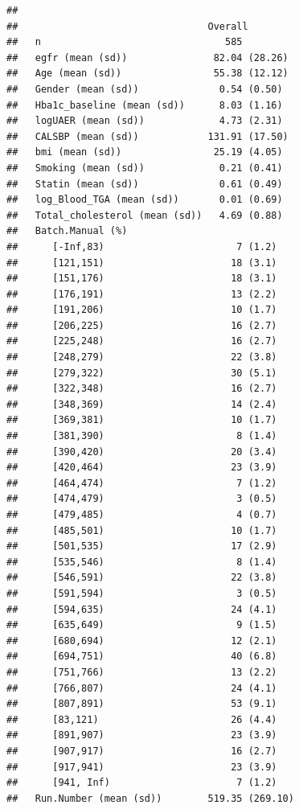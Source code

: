 \documentclass[]{article}
\begin{document}
\begin{verbatim}
##                                
##                                 Overall        
##   n                                585         
##   egfr (mean (sd))               82.04 (28.26) 
##   Age (mean (sd))                55.38 (12.12) 
##   Gender (mean (sd))              0.54 (0.50)  
##   Hba1c_baseline (mean (sd))      8.03 (1.16)  
##   logUAER (mean (sd))             4.73 (2.31)  
##   CALSBP (mean (sd))            131.91 (17.50) 
##   bmi (mean (sd))                25.19 (4.05)  
##   Smoking (mean (sd))             0.21 (0.41)  
##   Statin (mean (sd))              0.61 (0.49)  
##   log_Blood_TGA (mean (sd))       0.01 (0.69)  
##   Total_cholesterol (mean (sd))   4.69 (0.88)  
##   Batch.Manual (%)                             
##      [-Inf,83)                       7 (1.2)   
##      [121,151)                      18 (3.1)   
##      [151,176)                      18 (3.1)   
##      [176,191)                      13 (2.2)   
##      [191,206)                      10 (1.7)   
##      [206,225)                      16 (2.7)   
##      [225,248)                      16 (2.7)   
##      [248,279)                      22 (3.8)   
##      [279,322)                      30 (5.1)   
##      [322,348)                      16 (2.7)   
##      [348,369)                      14 (2.4)   
##      [369,381)                      10 (1.7)   
##      [381,390)                       8 (1.4)   
##      [390,420)                      20 (3.4)   
##      [420,464)                      23 (3.9)   
##      [464,474)                       7 (1.2)   
##      [474,479)                       3 (0.5)   
##      [479,485)                       4 (0.7)   
##      [485,501)                      10 (1.7)   
##      [501,535)                      17 (2.9)   
##      [535,546)                       8 (1.4)   
##      [546,591)                      22 (3.8)   
##      [591,594)                       3 (0.5)   
##      [594,635)                      24 (4.1)   
##      [635,649)                       9 (1.5)   
##      [680,694)                      12 (2.1)   
##      [694,751)                      40 (6.8)   
##      [751,766)                      13 (2.2)   
##      [766,807)                      24 (4.1)   
##      [807,891)                      53 (9.1)   
##      [83,121)                       26 (4.4)   
##      [891,907)                      23 (3.9)   
##      [907,917)                      16 (2.7)   
##      [917,941)                      23 (3.9)   
##      [941, Inf)                      7 (1.2)   
##   Run.Number (mean (sd))        519.35 (269.10)
\end{verbatim}
\end{document}
